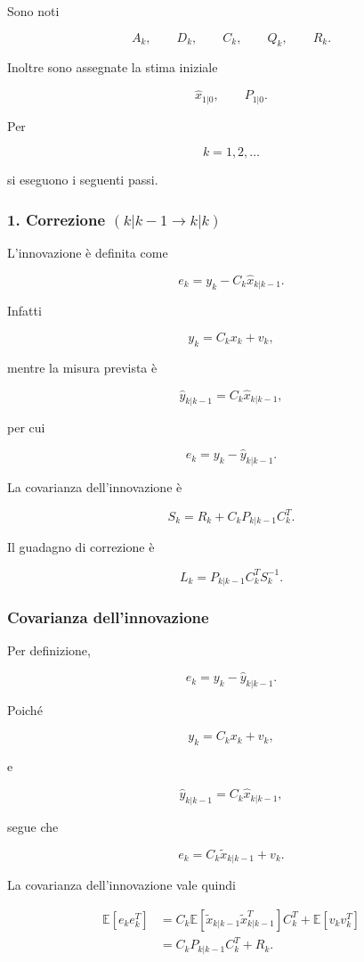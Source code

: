 \documentclass[11pt,a4paper]{article}
\begin{document}
Sono noti

\[
A_k,\qquad
D_k,\qquad
C_k,\qquad
Q_k,\qquad
R_k.
\]

Inoltre sono assegnate la stima iniziale

\[
\hat{x}_{1|0},
\qquad
P_{1|0}.
\]

Per

\[
k=1,2,\ldots
\]

si eseguono i seguenti passi.

\subsubsection*{1. Correzione \texorpdfstring{$(k|k-1\rightarrow k|k)$}{(k|k-1 -> k|k)}}

L'innovazione è definita come

\[
\boxed{
e_k
=
y_k-C_k\hat{x}_{k|k-1}.
}
\]

Infatti

\[
y_k=C_kx_k+v_k,
\]

mentre la misura prevista è

\[
\hat{y}_{k|k-1}
=
C_k\hat{x}_{k|k-1},
\]

per cui

\[
e_k
=
y_k-\hat{y}_{k|k-1}.
\]

La covarianza dell'innovazione è

\[
\boxed{
S_k
=
R_k
+
C_kP_{k|k-1}C_k^T.
}
\]

Il guadagno di correzione è

\[
\boxed{
L_k
=
P_{k|k-1}C_k^TS_k^{-1}.
}
\]

\subsubsection*{Covarianza dell'innovazione}

Per definizione,

\[
e_k
=
y_k-\hat{y}_{k|k-1}.
\]

Poiché

\[
y_k=C_kx_k+v_k,
\]

e

\[
\hat{y}_{k|k-1}
=
C_k\hat{x}_{k|k-1},
\]

segue che

\[
e_k
=
C_k\tilde{x}_{k|k-1}+v_k.
\]

La covarianza dell'innovazione vale quindi

\[
\begin{aligned}
\mathbb{E}[e_ke_k^T]
&=
C_k
\mathbb{E}
\!\left[
\tilde{x}_{k|k-1}
\tilde{x}_{k|k-1}^{T}
\right]
C_k^T
+
\mathbb{E}
\!\left[
v_kv_k^T
\right]
\\
&=
C_kP_{k|k-1}C_k^T+R_k.
\end{aligned}
\]
\end{document}
